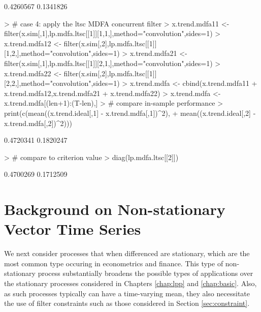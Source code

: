 \documentclass[a4paper]{book}
\begin{document}
\begin{Schunk}
\begin{Soutput}
[1] 0.4260567 0.1341826
\end{Soutput}
\begin{Sinput}
> # case 4: apply the ltsc MDFA concurrent filter 
> x.trend.mdfa11 <- filter(x.sim[,1],lp.mdfa.ltsc[[1]][1,1,],method="convolution",sides=1)
> x.trend.mdfa12 <- filter(x.sim[,2],lp.mdfa.ltsc[[1]][1,2,],method="convolution",sides=1)
> x.trend.mdfa21 <- filter(x.sim[,1],lp.mdfa.ltsc[[1]][2,1,],method="convolution",sides=1)
> x.trend.mdfa22 <- filter(x.sim[,2],lp.mdfa.ltsc[[1]][2,2,],method="convolution",sides=1)
> x.trend.mdfa <- cbind(x.trend.mdfa11 + x.trend.mdfa12,x.trend.mdfa21 + x.trend.mdfa22)
> x.trend.mdfa <- x.trend.mdfa[(len+1):(T-len),] 
> # compare in-sample performance
> print(c(mean((x.trend.ideal[,1] - x.trend.mdfa[,1])^2),
+ 	mean((x.trend.ideal[,2] - x.trend.mdfa[,2])^2)))
\end{Sinput}
\begin{Soutput}
[1] 0.4720341 0.1820247
\end{Soutput}
\begin{Sinput}
> # compare to criterion value
> diag(lp.mdfa.ltsc[[2]])
\end{Sinput}
\begin{Soutput}
[1] 0.4700269 0.1712509
\end{Soutput}
\end{Schunk}
  




\section{Background on Non-stationary Vector Time Series }
\label{sec:non-stat}

We next consider processes that when differenced are 
stationary, which are the most common type occuring in econometrics and finance.  
 This type of non-stationary process substantially broadens
  the possible types of applications over the stationary processes
   considered in Chapters \ref{chap:lpp} and \ref{chap:basic}.
  Also, as such processes typically can have a time-varying mean,
  they also necessitate the use of filter constraints such as those
   considered in Section \ref{sec:constraint}.
  
\end{document}
